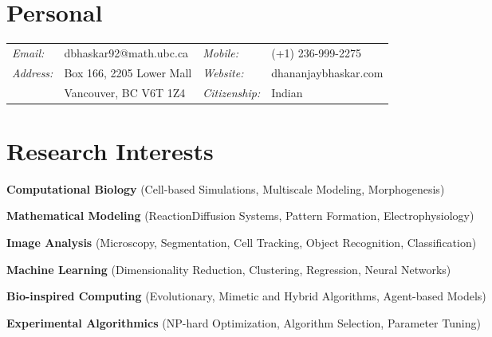 \documentclass[margin,line]{res}
\newenvironment{list4}{
  \begin{list}{\ding{113}}{
      \setlength{\itemsep}{0in}
      \setlength{\parsep}{0in} \setlength{\parskip}{0in}
      \setlength{\topsep}{0in} \setlength{\partopsep}{0in} 
      \setlength{\leftmargin}{0.0in}}}{\end{list}}
\begin{document}
\pagestyle{plain}

\vspace*{.2cm}
 

\begin{resume}

\vspace*{.2cm}

\section{\sc Personal}

\renewcommand{\arraystretch}{1.1}
\begin{tabular}{@{}p{1.4cm}p{6.7cm}p{2.1cm}p{4cm}}
{\it Email:}& dbhaskar92@math.ubc.ca &  {\it Mobile:}& (+1) 236-999-2275  \\
{\it Address:}& Box 166, 2205 Lower Mall & {\it Website:}& dhananjaybhaskar.com \\
& Vancouver, BC V6T 1Z4 & {\it Citizenship:}& Indian\\
\end{tabular}

\vspace*{.2cm}

\section{\sc Research Interests}
\begin{list4}
\item[]{\bf Computational Biology} (Cell-based Simulations, Multiscale Modeling, Morphogenesis)
\vspace*{.1cm}
\item[]{\bf Mathematical Modeling} (Reaction{\textendash}Diffusion Systems, Pattern Formation, Electrophysiology)
\vspace*{.1cm}
\item[]{\bf Image Analysis} (Microscopy, Segmentation, Cell Tracking, Object Recognition, Classification)
\vspace*{.1cm}
\item[]{\bf Machine Learning} (Dimensionality Reduction, Clustering, Regression, Neural Networks)
\vspace*{.1cm}
\item[]{\bf Bio-inspired Computing} (Evolutionary, Mimetic and Hybrid Algorithms, Agent-based Models)
\vspace*{.1cm}
\item[]{\bf Experimental Algorithmics} (NP-hard Optimization, Algorithm Selection, Parameter Tuning) 
\end{list4}


\end{resume}
\end{document}
